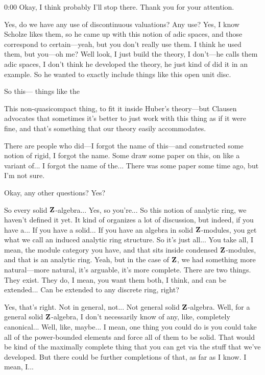 \begin{unfinished}{0:00}
Okay, I think probably I'll stop there. Thank you for your attention.

Yes, do we have any use of discontinuous valuations? Any use? Yes, I know Scholze likes them, so he came up with this notion of adic spaces, and those correspond to certain---yeah, but you don't really use them. I think he used them, but you---oh me? Well look, I just build the theory, I don't---he calls them adic spaces, I don't think he developed the theory, he just kind of did it in an example. So he wanted to exactly include things like this open unit disc.

So this--- things like the 

This non-quasicompact thing, to fit it inside Huber's theory---but Clausen advocates that sometimes it's better to just work with this thing as if it were fine, and that's something that our theory easily accommodates.

There are people who did---I forgot the name of this---and constructed some notion of rigid, I forgot the name. Some draw some paper on this, on like a variant of... I forgot the name of the... There was some paper some time ago, but I'm not sure.

Okay, any other questions? Yes?

So every solid $\mathbf Z$-algebra... Yes, so you're... So this notion of analytic ring, we haven't defined it yet. It kind of organizes a lot of discussion, but indeed, if you have a... If you have a solid... If you have an algebra in solid $\mathbf Z$-modules, you get what we call an induced analytic ring structure. So it's just all... You take all, I mean, the module category you have, and that sits inside condensed $\mathbf Z$-modules, and that is an analytic ring. Yeah, but in the case of $\mathbf Z$, we had something more natural---more natural, it's arguable, it's more complete. There are two things. They exist. They do, I mean, you want them both, I think, and can be extended... Can be extended to any discrete ring, right?

Yes, that's right. Not in general, not... Not general solid $\mathbf Z$-algebra. Well, for a general solid $\mathbf Z$-algebra, I don't necessarily know of any, like, completely canonical... Well, like, maybe... I mean, one thing you could do is you could take all of the power-bounded elements and force all of them to be solid. That would be kind of the maximally complete thing that you can get via the stuff that we've developed. But there could be further completions of that, as far as I know. I mean, I...


\end{unfinished}
